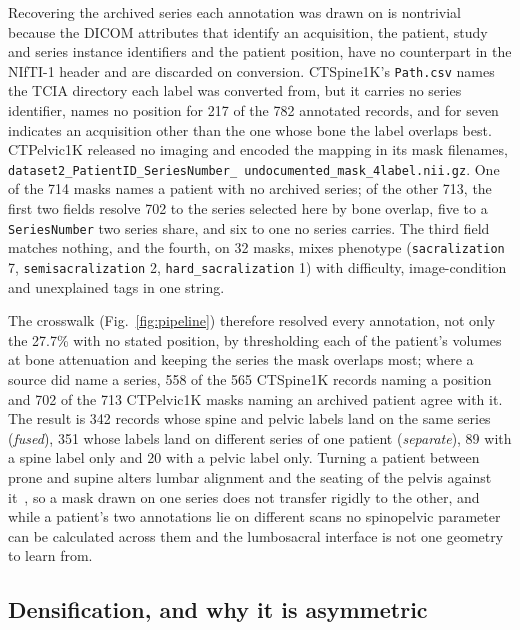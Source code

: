 \documentclass[aapm,mph,amsmath,amssymb,preprint,linenumbers]{revtex4-2}
\begin{document}
Recovering the archived series each annotation was drawn on is nontrivial because the DICOM
attributes that identify an acquisition, the patient, study and series instance identifiers
and the patient position,\cite{dicomps3} have no counterpart in the NIfTI-1
header\cite{nifti1} and are discarded on conversion.\cite{li2016} CTSpine1K's
\texttt{Path.csv} names the TCIA directory each label was converted from, but it carries no
series identifier, names no position for 217 of the 782 annotated records, and for seven
indicates an acquisition other than the one whose bone the label overlaps best.
CTPelvic1K released no imaging and encoded the mapping in its mask filenames,
\texttt{dataset2\_\allowbreak PatientID\_\allowbreak SeriesNumber\_\allowbreak
undocumented\_\allowbreak [tag\_]\allowbreak mask\_4label.nii.gz}. One of the 714 masks names a
patient with no archived series; of the other 713, the first two fields resolve 702 to the
series selected here by bone overlap, five to a \texttt{SeriesNumber} two series share, and six
to one no series carries. The third field matches nothing, and the fourth, on 32 masks, mixes
phenotype (\texttt{sacralization} 7, \texttt{semisacralization} 2,
\texttt{hard\_sacralization} 1) with difficulty, image-condition and unexplained tags in one
string.

The crosswalk (Fig.~\ref{fig:pipeline}) therefore resolved every annotation, not only the
27.7\% with no stated position, by thresholding each of the patient's volumes at bone
attenuation and keeping the series the mask overlaps most; where a source did name a series,
558 of the 565 CTSpine1K records naming a position and 702 of the 713 CTPelvic1K masks naming
an archived patient agree with it. The result is 342 records whose spine and pelvic labels
land on the same series (\emph{fused}), 351 whose labels land on different series of one
patient (\emph{separate}), 89 with a spine label only and 20 with a pelvic label only. Turning
a patient between prone and supine alters lumbar alignment and the seating of the pelvis
against it~\cite{hasegawa2018}, so a mask drawn on one series does not transfer rigidly to the
other, and while a patient's two annotations lie on different scans no spinopelvic parameter
can be calculated across them and the lumbosacral interface is not one geometry to learn from.

\subsection{Densification, and why it is asymmetric}
\end{document}
